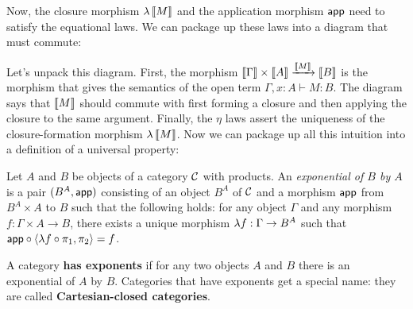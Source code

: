 Now, the closure morphism $\lambda \left\llbracket M \right\rrbracket$
and the application morphism $\mathsf{app}$ need to satisfy the equational
laws. We can package up these laws into a diagram that must commute:

\begin{center}
\end{center}

Let's unpack this diagram. First, the morphism $\left\llbracket \Gamma \right\rrbracket \times
\left\llbracket A \right\rrbracket \xrightarrow{\left\llbracket M \right\rrbracket} \left\llbracket B \right\rrbracket$ is the morphism that  gives
the semantics of the open term $\Gamma, x : A \vdash M : B$.
The diagram says that $\left\llbracket M \right\rrbracket$ should commute with first forming a
closure and then applying the closure to the same argument.
Finally, the $\eta$ laws assert the uniqueness of the closure-formation
morphism $\lambda \left\llbracket M \right\rrbracket$. Now we can package up all this intuition
into a definition of a universal property:

\begin{definition} \label{def:exponential}
  Let \(A\) and \(B\) be objects of a category \(\mathcal C\) with products.
  An \emph{exponential of \(B\) by \(A\)}
  is a pair \((B^A,\mathsf{app})\) consisting of
  an object \(B^A\) of \(\mathcal C\)
  and a morphism
  \(\mathsf{app}\) from \(B^A \times A\) to \(B\)
  such that the following holds:
  for any object $\Gamma$ and any morphism \(f : \Gamma \times A \to B\),
  there exists a unique morphism \(\lambda f : \Gamma \to B^A\)
  such that \(\mathsf{app} \circ \langle \lambda f \circ \pi_1, \pi_2\rangle = f\).
\end{definition}

A category \textbf{has exponents} if for any two objects $A$ and
$B$ there is an exponential of $A$ by $B$.
Categories that have exponents get a special name: they are called
\textbf{Cartesian-closed categories}.

